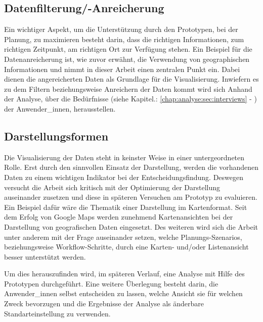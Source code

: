 \documentclass[Bachelorarbeit.tex]{subfiles}
\begin{document}
\subsection*{Datenfilterung/-Anreicherung}
Ein wichtiger Aspekt, um die Unterstützung durch den Prototypen, bei der Planung, zu maximieren besteht darin, dass die richtigen Informationen, zum richtigen Zeitpunkt, am richtigen Ort zur Verfügung stehen. 
Ein Beispiel für die Datenanreicherung ist, wie zuvor erwähnt, die Verwendung von geographischen Informationen und nimmt in dieser Arbeit einen zentralen Punkt ein. 
Dabei dienen die angereicherten Daten als Grundlage für die Visualisierung.
Inwiefern es zu dem Filtern beziehungsweise Anreichern der Daten kommt wird sich Anhand der Analyse, über die Bedürfnisse (siehe Kapitel.: \ref{chap:analyse:sec:interviews} - ) der Anwender\_innen, herausstellen.

\subsection*{Darstellungsformen}
Die Visualisierung der Daten steht in keinster Weise in einer untergeordneten Rolle.
Erst durch den sinnvollen Einsatz der Darstellung, werden die vorhandenen Daten zu einem wichtigen Indikator bei der Entscheidungsfindung.
Deswegen versucht die Arbeit sich kritisch mit der Optimierung der Darstellung auseinander zusetzen und diese in späteren Versuchen am Prototyp zu evaluieren.
Ein Beispiel dafür wäre die Thematik einer Darstellung im Kartenformat.
Seit dem Erfolg von Google Maps werden zunehmend Kartenansichten bei der Darstellung von geografischen Daten eingesetzt. 
Des weiteren wird sich die Arbeit unter anderem mit der Frage auseinander setzen, welche Planungs-Szenarios, beziehungsweise Workflow-Schritte, durch eine Karten- und/oder Listenansicht besser unterstützt werden.

\newpage
Um dies herauszufinden wird, im späteren Verlauf, eine Analyse mit Hilfe des Prototypen durchgeführt.
Eine weitere Überlegung besteht darin, die Anwender\_innen selbst entscheiden zu lassen, welche Ansicht sie für welchen Zweck bevorzugen und die Ergebnisse der Analyse als änderbare Standarteinstellung zu verwenden.
\end{document}
